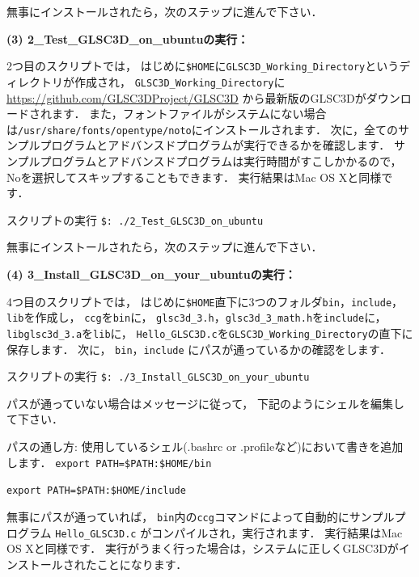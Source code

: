 \documentclass[platex,a4paper,12pt]{jsarticle}%
\begin{document}
無事にインストールされたら，次のステップに進んで下さい．

\noindent 
{\bf (3) 2\_Test\_GLSC3D\_on\_ubuntuの実行：} 

2つ目のスクリプトでは，
はじめに\verb|$HOME|に\verb|GLSC3D_Working_Directory|というディレクトリが作成され，
\verb|GLSC3D_Working_Directory|に
\url{https://github.com/GLSC3DProject/GLSC3D}
から最新版のGLSC3Dがダウンロードされます．
また，フォントファイルがシステムにない場合は\verb|/usr/share/fonts/opentype/noto|にインストールされます．
次に，全てのサンプルプログラムとアドバンスドプログラムが実行できるかを確認します．
サンプルプログラムとアドバンスドプログラムは実行時間がすこしかかるので，Noを選択してスキップすることもできます．
実行結果はMac OS Xと同様です．

\begin{itembox}[l]{スクリプトの実行}
\verb|$: ./2_Test_GLSC3D_on_ubuntu|
\end{itembox}

無事にインストールされたら，次のステップに進んで下さい．

\noindent 
{\bf (4) 3\_Install\_GLSC3D\_on\_your\_ubuntuの実行：} 

4つ目のスクリプトでは，
はじめに\verb|$HOME|直下に3つのフォルダ\verb|bin|，\verb|include|，\verb|lib|を作成し，
\verb|ccg|を\verb|bin|に，
\verb|glsc3d_3.h|，\verb|glsc3d_3_math.h|を\verb|include|に，
\verb|libglsc3d_3.a|を\verb|lib|に，
\verb|Hello_GLSC3D.c|を\verb|GLSC3D_Working_Directory|の直下に保存します．
次に，
\verb|bin|，\verb|include|
にパスが通っているかの確認をします．

\begin{itembox}[l]{スクリプトの実行}
\verb|$: ./3_Install_GLSC3D_on_your_ubuntu|
\end{itembox}

パスが通っていない場合はメッセージに従って，
下記のようにシェルを編集して下さい．

\begin{itembox}[l]{パスの通し方: 使用しているシェル(.bashrc or .profileなど)において書きを追加します．}
\verb|export PATH=$PATH:$HOME/bin|
	
\verb|export PATH=$PATH:$HOME/include|
\end{itembox}

無事にパスが通っていれば，
\verb|bin|内の\verb|ccg|コマンドによって自動的にサンプルプログラム \verb|Hello_GLSC3D.c| がコンパイルされ，実行されます．
実行結果はMac OS Xと同様です．
実行がうまく行った場合は，システムに正しくGLSC3Dがインストールされたことになります．
\end{document}
